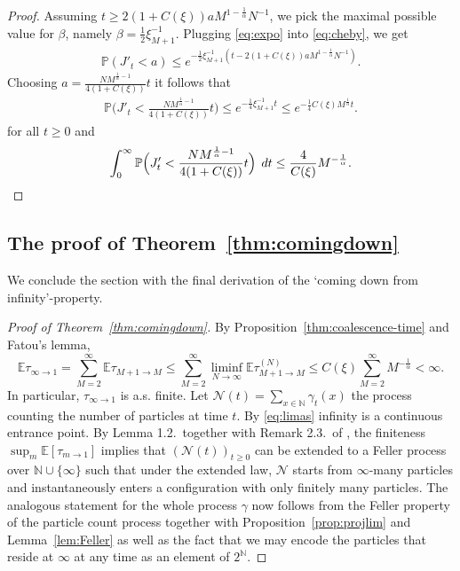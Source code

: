 \documentclass[11pt,a4paper]{scrartcl}
\numberwithin{equation}{section}
\theoremstyle{plain}
\theoremstyle{definition}
\theoremstyle{remark}
\newcommand{\bE}{\ensuremath{\mathbb{E}}}
\newcommand{\bN}{\ensuremath{\mathbb{N}}}
\newcommand{\bP}{\ensuremath{\mathbb{P}}}
\newcommand{\di}{\,\textup{d}}
\newcommand{\super}[1]{{(#1)}}
\begin{document}
\begin{proof}
	Assuming $t\geq 2(1+C(\xi))a M^{1-\frac1\alpha} N^{-1}$, we pick the maximal possible value for $\beta$, namely $\beta = \frac12\xi_{M+1}^{-1}$. Plugging  \eqref{eq:expo} into \eqref{eq:cheby}, we get
	\begin{align}
		\bP(J'_t < a ) \leq e^{-\frac12\xi_{M+1}^{-1}( t-  2(1+C(\xi)) a M^{1-\frac1\alpha} N^{-1} )}.
	\end{align}
	Choosing $a = \frac{N M^{\frac1\alpha-1} }{4(1+C(\xi))} t$ it follows that 
	\begin{align}
		\bP\Big(J'_t < \frac{N M^{\frac1\alpha-1}}{4(1+C(\xi))} t \Big) \leq e^{-\frac14\xi_{M+1}^{-1}t}
		\leq e^{-\frac14C(\xi)M^{\frac1\alpha}t}.
	\end{align}
	for all $t\geq 0$ and 
	\begin{align}
		\int_0^\infty \bP\Big(J'_t < \frac{N M^{\frac1\alpha-1} }{4(1+C(\xi))} t \Big) \;\di t 
		\leq \frac4{C(\xi)}M^{-\frac1\alpha}.
	\end{align}
\end{proof}

\subsection*{The proof of Theorem~\ref{thm:comingdown}}
We conclude the section with the final derivation of the `coming down from infinity'-property.
\begin{proof}[Proof of Theorem~\ref{thm:comingdown}]
By Proposition~\ref{thm:coalescence-time} and Fatou's lemma,
\begin{equation}\label{eq:limas}
	\bE \tau_{\infty\to1} = \sum_{M=2}^\infty \bE \tau_{M+1\to M} 
	\leq \sum_{M=2}^\infty \liminf_{N\to\infty} \bE \tau^\super{N}_{M+1\to M}
	\leq C(\xi)\sum_{M=2}^\infty M^{-\frac1\alpha}
	<\infty.
\end{equation}
In particular, $\tau_{\infty\to1}$ is a.s. finite. Let $\mathcal{N}(t)=\sum_{x\in\mathbb{N}} \gamma_t(x)$ the process counting the number of particles at time $t$. By \eqref{eq:limas} infinity is a continuous entrance point. By Lemma 1.2.\ together with Remark 2.3.\ of \cite{Foucart20}, the finiteness
\(
\sup_{m}\bE[\tau_{m\to1}]
\)
implies that $(\mathcal{N}(t))_{t\geq 0}$ can be extended to a Feller process over $\bN\cup\{\infty\}$ such that under the extended law, $\mathcal{N}$ starts from $\infty$-many particles and instantaneously enters a configuration with only finitely many particles.  The analogous statement for the whole process $\gamma$ now follows from the Feller property of the particle count process together with Proposition~\ref{prop:projlim} and Lemma~\ref{lem:Feller} as well as the fact that we may encode the particles that reside at $\infty$ at any time as an element of $2^{\bN}$.
\end{proof}
\end{document}
